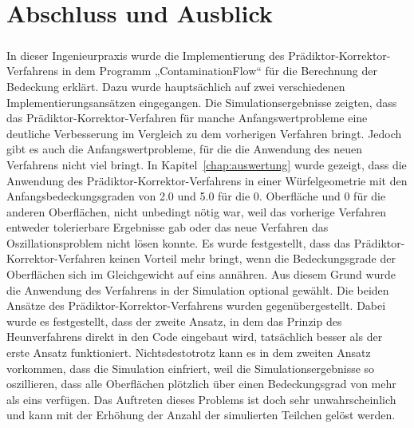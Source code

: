 \documentclass{listhesis}
\begin{document}

\chapter{Abschluss und Ausblick} \label{chap:abschluss}
\paragraph{}
In dieser Ingenieurpraxis wurde die Implementierung des Prädiktor-Korrektor-Verfahrens in dem Programm „ContaminationFlow“ für die Berechnung der Bedeckung erklärt. Dazu wurde hauptsächlich auf zwei verschiedenen Implementierungsansätzen eingegangen. Die Simulationsergebnisse zeigten, dass das Prädiktor-Korrektor-Verfahren für manche Anfangswertprobleme eine deutliche Verbesserung im Vergleich zu dem vorherigen Verfahren bringt. Jedoch gibt es auch die Anfangswertprobleme, für die die Anwendung des neuen Verfahrens nicht viel bringt. In Kapitel~\ref{chap:auswertung} wurde gezeigt, dass die Anwendung des Prädiktor-Korrektor-Verfahrens in einer Würfelgeometrie mit den Anfangsbedeckungsgraden von 2.0 und 5.0 für die 0. Oberfläche und 0 für die anderen Oberflächen, nicht unbedingt nötig war, weil das vorherige Verfahren entweder tolerierbare Ergebnisse gab oder das neue Verfahren das Oszillationsproblem nicht lösen konnte. Es wurde festgestellt, dass das Prädiktor-Korrektor-Verfahren keinen Vorteil mehr bringt, wenn die Bedeckungsgrade der Oberflächen sich im Gleichgewicht auf eins annähren. Aus diesem Grund wurde die Anwendung des Verfahrens in der Simulation optional gewählt. Die beiden Ansätze des Prädiktor-Korrektor-Verfahrens wurden gegenübergestellt. Dabei wurde es festgestellt, dass der zweite Ansatz, in dem das Prinzip des Heunverfahrens direkt in den Code eingebaut wird, tatsächlich besser als der erste Ansatz funktioniert. Nichtsdestotrotz kann es in dem zweiten Ansatz vorkommen, dass die Simulation einfriert, weil die Simulationsergebnisse so oszillieren, dass alle Oberflächen plötzlich über einen Bedeckungsgrad von mehr als eins verfügen. Das Auftreten dieses Problems ist doch sehr unwahrscheinlich und kann mit der Erhöhung der Anzahl der simulierten Teilchen gelöst werden.
\end{document}

